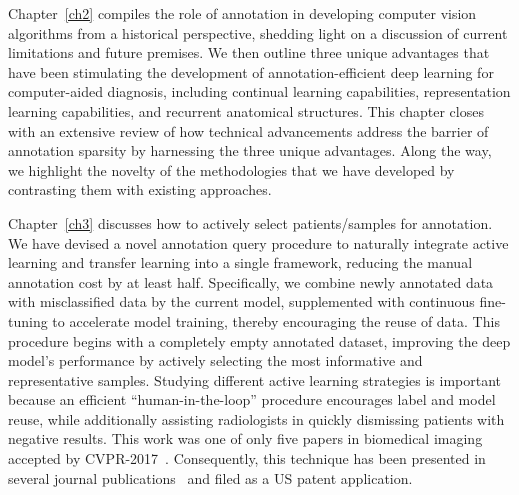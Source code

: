 Chapter~\ref{ch2} compiles the role of annotation in developing computer vision algorithms from a historical perspective, shedding light on a discussion of current limitations and future premises. We then outline three unique advantages that have been stimulating the development of annotation-efficient deep learning for computer-aided diagnosis, including continual learning capabilities, representation learning capabilities, and recurrent anatomical structures. This chapter closes with an extensive review of how technical advancements address the barrier of annotation sparsity by harnessing the three unique advantages. Along the way, we highlight the novelty of the methodologies that we have developed by contrasting them with existing approaches. 


    
Chapter~\ref{ch3} discusses how to actively select patients/samples for annotation. We have devised a novel annotation query procedure to naturally integrate active learning and transfer learning into a single framework, reducing the manual annotation cost by at least half. Specifically, we combine newly annotated data with misclassified data by the current model, supplemented with continuous fine-tuning to accelerate model training, thereby encouraging the reuse of data. This procedure begins with a completely empty annotated dataset, improving the deep model's performance by actively selecting the most informative and representative samples. Studying different active learning strategies is important because an efficient ``human-in-the-loop'' procedure encourages label and model reuse, while additionally assisting radiologists in quickly dismissing patients with negative results. This work was one of only five papers in biomedical imaging accepted by CVPR-2017~\citep{zhou2017fine}. Consequently, this technique has been presented in several journal publications~\citep{zhou2019integrating,zhou2021active} and filed as a US patent application.
    
